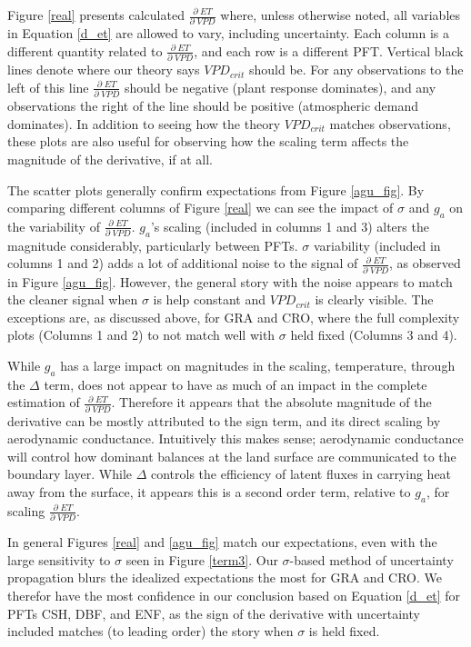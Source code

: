 \documentclass[draft,linenumbers]{agujournal}
\begin{document}
Figure \ref{real} presents calculated $\frac{\partial \; ET}{\partial \; VPD}$ where, unless otherwise noted, all variables in Equation \ref{d_et} are allowed to vary, including uncertainty. Each column is a different quantity related to $\frac{\partial \; ET}{\partial \; VPD}$, and each row is a different PFT. Vertical black lines denote where our theory says $VPD_{crit}$ should be. For any observations to the left of this line $\frac{\partial \; ET}{\partial \; VPD}$ should be negative (plant response dominates), and any observations the right of the line should be positive (atmospheric demand dominates). In addition to seeing how the theory $VPD_{crit}$ matches observations, these plots are also useful for observing how the scaling term affects the magnitude of the derivative, if at all. 

The scatter plots generally confirm expectations from Figure \ref{agu_fig}. By comparing different columns of Figure \ref{real} we can see the impact of $\sigma$ and $g_a$ on the variability of $\frac{\partial \; ET}{\partial \; VPD}$. $g_a$'s scaling (included in columns 1 and 3) alters the magnitude considerably, particularly between PFTs. $\sigma$ variability (included in columns 1 and 2) adds a lot of additional noise to the signal of $\frac{\partial \; ET}{\partial \; VPD}$, as observed in Figure \ref{agu_fig}. However, the general story with the noise appears to match the cleaner signal when $\sigma$ is help constant and $VPD_{crit}$ is clearly visible. The exceptions are, as discussed above, for GRA and CRO, where the full complexity plots (Columns 1 and 2) to not match well with $\sigma$ held fixed (Columns 3 and 4).

While $g_a$ has a large impact on magnitudes in the scaling, temperature, through the $\Delta$ term, does not appear to have as much of an impact in the complete estimation of $\frac{\partial \; ET}{\partial \; VPD}$. Therefore it appears that the absolute magnitude of the derivative can be mostly attributed to the sign term, and its direct scaling by aerodynamic conductance. Intuitively this makes sense; aerodynamic conductance will control how dominant balances at the land surface are communicated to the boundary layer. While $\Delta$ controls the efficiency of latent fluxes in carrying heat away from the surface, it appears this is a second order term, relative to $g_a$, for scaling $\frac{\partial \; ET}{\partial \; VPD}$. 

In general Figures \ref{real} and \ref{agu_fig} match our expectations, even with the large sensitivity to $\sigma$ seen in Figure \ref{term3}. Our $\sigma$-based method of uncertainty propagation blurs the idealized expectations the most for GRA and CRO. We therefor have the most confidence in our conclusion based on Equation \ref{d_et} for PFTs CSH, DBF, and ENF, as the sign of the derivative with uncertainty included matches (to leading order) the story when $\sigma$ is held fixed.
\end{document}
